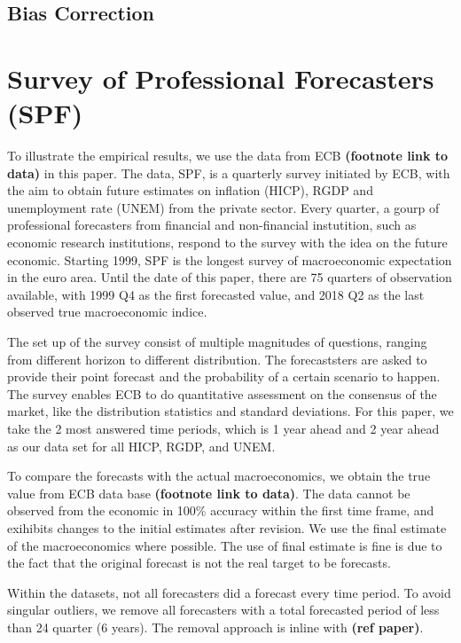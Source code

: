 \documentclass[]{article}
\begin{document}
\hypertarget{bias-correction}{%
\subsection{Bias Correction}\label{bias-correction}}

\hypertarget{survey-of-professional-forecasters-spf}{%
\section{Survey of Professional Forecasters
(SPF)}\label{survey-of-professional-forecasters-spf}}

To illustrate the empirical results, we use the data from ECB
\textbf{(footnote link to data)} in this paper. The data, SPF, is a
quarterly survey initiated by ECB, with the aim to obtain future
estimates on inflation (HICP), RGDP and unemployment rate (UNEM) from
the private sector. Every quarter, a gourp of professional forecasters
from financial and non-financial instutition, such as economic research
institutions, respond to the survey with the idea on the future
economic. Starting 1999, SPF is the longest survey of macroeconomic
expectation in the euro area. Until the date of this paper, there are 75
quarters of observation available, with 1999 Q4 as the first forecasted
value, and 2018 Q2 as the last observed true macroeconomic indice.

The set up of the survey consist of multiple magnitudes of questions,
ranging from different horizon to different distribution. The
forecaststers are asked to provide their point forecast and the
probability of a certain scenario to happen. The survey enables ECB to
do quantitative assessment on the consensus of the market, like the
distribution statistics and standard deviations. For this paper, we take
the 2 most answered time periods, which is 1 year ahead and 2 year ahead
as our data set for all HICP, RGDP, and UNEM.

To compare the forecasts with the actual macroeconomics, we obtain the
true value from ECB data base \textbf{(footnote link to data)}. The data
cannot be observed from the economic in 100\% accuracy within the first
time frame, and exihibits changes to the initial estimates after
revision. We use the final estimate of the macroeconomics where
possible. The use of final estimate is fine is due to the fact that the
original forecast is not the real target to be forecasts.

Within the datasets, not all forecasters did a forecast every time
period. To avoid singular outliers, we remove all forecasters with a
total forecasted period of less than 24 quarter (6 years). The removal
approach is inline with \textbf{(ref paper)}.
\end{document}
